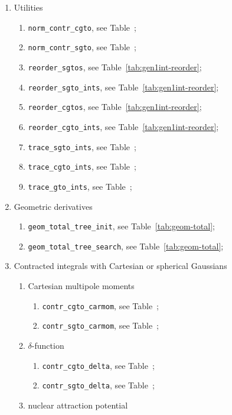 \documentclass[a4paper,11pt,twoside,openright]{book}
\begin{document}
\begin{enumerate}
  \item Utilities
    \begin{enumerate}
      \item \verb|norm_contr_cgto|, see Table~;
      \item \verb|norm_contr_sgto|, see Table~;
      \item \verb|reorder_sgtos|, see Table~\ref{tab:gen1int-reorder};
      \item \verb|reorder_sgto_ints|, see Table~\ref{tab:gen1int-reorder};
      \item \verb|reorder_cgtos|, see Table~\ref{tab:gen1int-reorder};
      \item \verb|reorder_cgto_ints|, see Table~\ref{tab:gen1int-reorder};
      \item \verb|trace_sgto_ints|, see Table~;
      \item \verb|trace_cgto_ints|, see Table~;
      \item \verb|trace_gto_ints|, see Table~;
    \end{enumerate}
%
  \item Geometric derivatives
  \begin{enumerate}
    \item \verb|geom_total_tree_init|, see Table~\ref{tab:geom-total};
    \item \verb|geom_total_tree_search|, see Table~\ref{tab:geom-total};
  \end{enumerate}
%
  \item Contracted integrals with Cartesian or spherical Gaussians
  \begin{enumerate}
    \item Cartesian multipole moments
    \begin{enumerate}
      \item \verb|contr_cgto_carmom|, see Table~;
      \item \verb|contr_sgto_carmom|, see Table~;
    \end{enumerate}
    \item $\delta$-function
    \begin{enumerate}
      \item \verb|contr_cgto_delta|, see Table~;
      \item \verb|contr_sgto_delta|, see Table~;
    \end{enumerate}
    \item nuclear attraction potential
    \begin{enumerate}

\end{enumerate}
\end{enumerate}
\end{enumerate}
\end{document}
